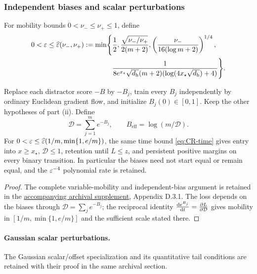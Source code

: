 \subsubsection{Independent biases and scalar perturbations}
\label{app:CR-independent}
For mobility bounds $0<\nu_-\le\nu_+\le1$, define
\begin{equation}
 \begin{aligned}
 0<\varepsilon\le\widehat{\varepsilon}(\nu_-,\nu_+):=\min\Biggl\{&\frac12,
 \frac{\sqrt{\nu_-/\nu_+}}{2(m+2)},
 \left(\frac{\nu_-}{16(\log m+2)}\right)^{1/4},\\
 &\frac1{8e^{x_\star}\sqrt{d_{\mathrm h}}(m+2)(\log(4x_\star\sqrt{d_{\mathrm h}})+4)}\Biggr\}.
 \end{aligned}
 \label{eq:CR-variable-scale}
\end{equation}
\begin{corollary}
\label{cor:CR-independent}
Replace each distractor score $-B$ by $-B_j$, train every $B_j$ independently by ordinary Euclidean gradient flow,
and initialize $B_j(0)\in[0,1]$. Keep the other hypotheses of part (ii).
Define
\[
 \mathcal D=\sum_{j=1}^m e^{-B_j},\qquad B_{\mathrm{eff}}=\log(m/\mathcal D).
\]
For $0<\varepsilon\le\widehat{\varepsilon}(1/m,\min\{1,e/m\})$, the same time bound \cref{eq:CR-time} gives
entry into $x\ge x_\star$, $\mathcal D\le1$, retention until $L\le z$, and persistent positive margins on every binary transition.
In particular the biases need not start equal or remain equal, and the $\varepsilon^{-4}$ polynomial rate is retained.
\end{corollary}
\begin{proof}
The complete variable-mobility and independent-bias argument is retained in the
\href{archival_full_version.pdf}{accompanying archival supplement}, Appendix D.3.1.
The loss depends on the biases through $\mathcal D=\sum_j e^{-B_j}$; the reciprocal
identity $\ddt{e^{B_j}}=\pd{L}{\mathcal D}$ gives mobility in
$[1/m,\min\{1,e/m\}]$ and the sufficient scale stated there.
\end{proof}
\paragraph{Gaussian scalar perturbations.}\label{cor:CR-scalar-Gaussian}
The Gaussian scalar/offset specialization and its quantitative tail conditions
are retained with their proof in the same archival section.
